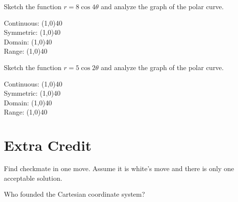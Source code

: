 \documentclass[addpoints]{exam}
\begin{document}
\begin{questions}
    \question[1] Sketch the function $r = 8\cos4\theta$ and analyze the graph of the polar curve.
    
        \begin{left} 
        \end{left}
    
    Continuous: \line(1,0){40} \\
    \newline
    Symmetric: \line(1,0){40} \\
    \newline
    Domain: \line(1,0){40} \\
    \newline
    Range: \line(1,0){40} \\
    
    \newpage
    \question[1] Sketch the function $r = 5\cos2\theta$ and analyze the graph of the polar curve.
    
        \begin{left} 
        \end{left}
    
    Continuous: \line(1,0){40} \\
    \newline
    Symmetric: \line(1,0){40} \\
    \newline
    Domain: \line(1,0){40} \\
    \newline
    Range: \line(1,0){40} \\
    \end{questions}
    
\newpage
\section*{Extra Credit}
    \begin{questions}
    \setcounter{question}{100}
   
    \bonusquestion[10] Find checkmate in one move. Assume it is white's move and there is only one acceptable solution. \newline
    \newgame
    \showboard
    
    \bonusquestion[3] Who founded the Cartesian coordinate system?
    \end{questions}   
\newpage
\end{document}
